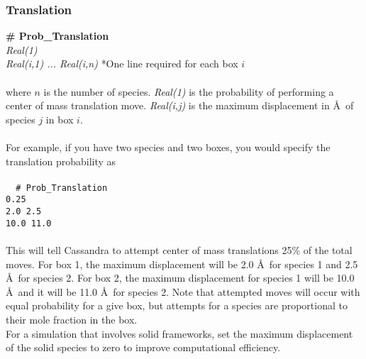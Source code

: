 \subsubsection{Translation}
{\bf \# Prob\_Translation}\\
{\it Real(1)} \\
{\it Real(i,1) ... Real(i,n) } *One line required for each box $i$ \\ \\
%
where $n$ is the number of species. 
{\it Real(1)} is the probability of performing a center of mass translation move.
{\it Real(i,j)} is the maximum displacement in \AA\ of species $j$ in box $i$. \\ \\
%
For example, if you have two species and two boxes, you would specify
the translation probability as \\ \\
\texttt{
{ \# Prob\_Translation} \\
 0.25 \\
2.0 2.5\\
10.0 11.0} 
\\ \\
This will tell Cassandra to attempt center of mass translations 25\%
of the total moves. For box 1, the maximum displacement will be 2.0 \AA\ for
species 1 and 2.5 \AA\ for species 2. For box 2, the maximum
displacement for species 1 will be 10.0 \AA\ and it will be 11.0
\AA\ for species 2. Note that attempted moves will occur with equal
probability for a give box, but attempts for a species are
proportional to their mole fraction in the box. \\

For a simulation that involves solid frameworks, set the
maximum displacement of the solid species to zero to improve computational efficiency.

